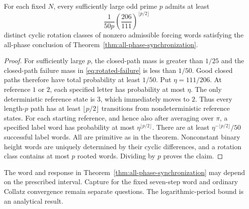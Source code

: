 \begin{corollary}
\label{cor:many-sync-families}
For each fixed $N$, every sufficiently large odd prime $p$ admits
at least
\[
 \frac1{50p}\left(\frac{206}{111}\right)^{\lfloor p/2\rfloor}
\]
distinct cyclic rotation classes of nonzero admissible forcing
words satisfying the all-phase conclusion of
Theorem~\ref{thm:all-phase-synchronization}.
\end{corollary}
\begin{proof}
For sufficiently large $p$, the closed-path mass is greater than
$1/25$ and the closed-path failure mass in
\eqref{eq:rotated-failure} is less than $1/50$. Good closed paths
therefore have total probability at least $1/50$. Put
$\eta=111/206$. At reference $1$ or $2$, each specified letter
has probability at most $\eta$. The only deterministic reference
state is $3$, which immediately moves to $2$. Thus every
length-$p$ path has at least $\lfloor p/2\rfloor$ transitions
from nondeterministic reference states. For each starting
reference, and hence also after averaging over $\pi$, a
specified label word has probability at most
$\eta^{\lfloor p/2\rfloor}$. There are at least
$\eta^{-\lfloor p/2\rfloor}/50$ successful label words.
All are primitive as in the theorem. Nonconstant binary height
words are uniquely determined by their cyclic differences, and
a rotation class contains at most $p$ rooted words. Dividing by
$p$ proves the claim.
\end{proof}

The word and response in Theorem~\ref{thm:all-phase-synchronization}
may depend on the prescribed interval. Capture for the fixed seven-step
word and ordinary Collatz convergence remain separate questions.
The logarithmic-period bound is an analytical result.

